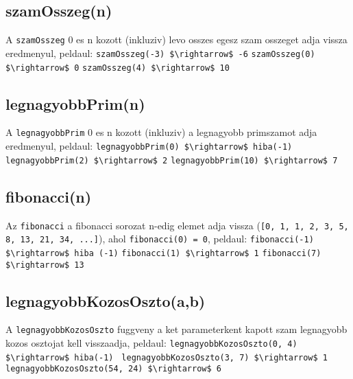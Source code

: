 \documentclass{article}
\begin{document}
\subsection{szamOsszeg(n)}
A \lstinline{szamOsszeg} 0 es n kozott (inkluziv) levo osszes egesz szam osszeget adja vissza eredmenyul, peldaul:\newline
\lstinline[mathescape]{szamOsszeg(-3) $\rightarrow$ -6}\newline
\lstinline[mathescape]{szamOsszeg(0) $\rightarrow$ 0}\newline
\lstinline[mathescape]{szamOsszeg(4) $\rightarrow$ 10}\newline

\subsection{legnagyobbPrim(n)}
A \lstinline{legnagyobbPrim} 0 es n kozott (inkluziv) a legnagyobb primszamot adja eredmenyul, peldaul:\newline
\lstinline[mathescape]{legnagyobbPrim(0) $\rightarrow$ hiba(-1)}\newline
\lstinline[mathescape]{legnagyobbPrim(2) $\rightarrow$ 2}\newline
\lstinline[mathescape]{legnagyobbPrim(10) $\rightarrow$ 7}\newline

\subsection{fibonacci(n)}
Az \lstinline{fibonacci} a fibonacci sorozat n-edig elemet adja vissza \newline (\lstinline{[0, 1, 1, 2, 3, 5, 8, 13, 21, 34, ...]}), ahol \lstinline|fibonacci(0) = 0|, peldaul: \newline
\lstinline[mathescape]{fibonacci(-1) $\rightarrow$ hiba (-1)}\newline
\lstinline[mathescape]{fibonacci(1) $\rightarrow$ 1}\newline
\lstinline[mathescape]{fibonacci(7) $\rightarrow$ 13}\newline

\subsection{legnagyobbKozosOszto(a,b)}

A \lstinline{legnagyobbKozosOszto} fuggveny a ket parameterkent kapott szam legnagyobb kozos osztojat kell visszaadja, peldaul:\newline
\lstinline[mathescape]{legnagyobbKozosOszto(0, 4) $\rightarrow$ hiba(-1) }\newline
\lstinline[mathescape]{legnagyobbKozosOszto(3, 7) $\rightarrow$ 1}\newline
\lstinline[mathescape]{legnagyobbKozosOszto(54, 24) $\rightarrow$ 6}\newline
\end{document}
